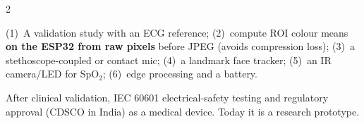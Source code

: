 \begin{multicols}{2}

{(1)~A validation study with an ECG reference; (2)~compute ROI colour means \textbf{on the ESP32 from raw pixels} before JPEG
(avoids compression loss); (3)~a stethoscope-coupled or contact mic; (4)~a landmark face tracker; (5)~an IR camera/LED for SpO$_2$;
(6)~edge processing and a battery.}

{After clinical validation, IEC 60601 electrical-safety testing and regulatory approval (CDSCO in India) as a medical device. Today
it is a research prototype.}

\end{multicols}
